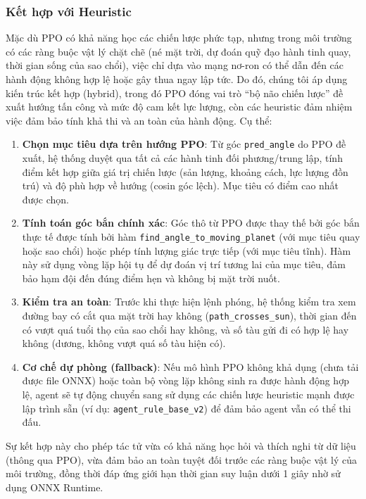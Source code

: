 \subsubsection{Kết hợp với Heuristic}
Mặc dù PPO có khả năng học các chiến lược phức tạp, nhưng trong môi trường có các ràng buộc vật lý chặt chẽ (né mặt trời, dự đoán quỹ đạo hành tinh quay, thời gian sống của sao chổi), việc chỉ dựa vào mạng nơ-ron có thể dẫn đến các hành động không hợp lệ hoặc gây thua ngay lập tức. 
Do đó, chúng tôi áp dụng kiến trúc kết hợp (hybrid), trong đó PPO đóng vai trò ``bộ não chiến lược'' đề xuất hướng tấn công và mức độ cam kết lực lượng, còn các heuristic đảm nhiệm việc đảm bảo tính khả thi và an toàn của hành động. Cụ thể:

\begin{enumerate}
    \item \textbf{Chọn mục tiêu dựa trên hướng PPO}: Từ góc \texttt{pred\_angle} do PPO đề xuất, hệ thống duyệt qua tất cả các hành tinh đối phương/trung lập, tính điểm kết hợp giữa giá trị chiến lược (sản lượng, khoảng cách, lực lượng đồn trú) và độ phù hợp về hướng (cosin góc lệch). Mục tiêu có điểm cao nhất được chọn.
    \item \textbf{Tính toán góc bắn chính xác}: Góc thô từ PPO được thay thế bởi góc bắn thực tế được tính bởi hàm \texttt{find\_angle\_to\_moving\_planet} (với mục tiêu quay hoặc sao chổi) hoặc phép tính lượng giác trực tiếp (với mục tiêu tĩnh). Hàm này sử dụng vòng lặp hội tụ để dự đoán vị trí tương lai của mục tiêu, đảm bảo hạm đội đến đúng điểm hẹn và không bị mặt trời nuốt.
    \item \textbf{Kiểm tra an toàn}: Trước khi thực hiện lệnh phóng, hệ thống kiểm tra xem đường bay có cắt qua mặt trời hay không (\texttt{path\_crosses\_sun}), thời gian đến có vượt quá tuổi thọ của sao chổi hay không, và số tàu gửi đi có hợp lệ hay không (dương, không vượt quá số tàu hiện có).
    \item \textbf{Cơ chế dự phòng (fallback)}: Nếu mô hình PPO không khả dụng (chưa tải được file ONNX) hoặc toàn bộ vòng lặp không sinh ra được hành động hợp lệ, agent sẽ tự động chuyển sang sử dụng các chiến lược heuristic mạnh được lập trình sẵn (ví dụ: \texttt{agent\_rule\_base\_v2}) để đảm bảo agent vẫn có thể thi đấu.
\end{enumerate}

Sự kết hợp này cho phép tác tử vừa có khả năng học hỏi và thích nghi từ dữ liệu (thông qua PPO), vừa đảm bảo an toàn tuyệt đối trước các ràng buộc vật lý của môi trường, đồng thời đáp ứng giới hạn thời gian suy luận dưới 1 giây nhờ sử dụng ONNX Runtime.

